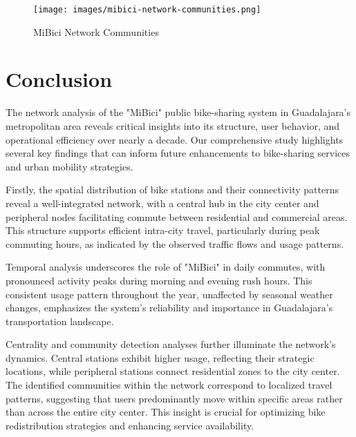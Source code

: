 \documentclass[conference]{IEEEtran}
\begin{document}
\begin{figure}
    \centering
    \texttt{[image: images/mibici-network-communities.png]}
    \caption{MiBici Network Communities}
    \label{fig:mibici-communinities}
\end{figure}


\section{Conclusion}

The network analysis of the "MiBici" public bike-sharing system in Guadalajara's metropolitan area reveals critical insights into its structure, user behavior, and operational efficiency over nearly a decade. Our comprehensive study highlights several key findings that can inform future enhancements to bike-sharing services and urban mobility strategies.

Firstly, the spatial distribution of bike stations and their connectivity patterns reveal a well-integrated network, with a central hub in the city center and peripheral nodes facilitating commute between residential and commercial areas. This structure supports efficient intra-city travel, particularly during peak commuting hours, as indicated by the observed traffic flows and usage patterns.

Temporal analysis underscores the role of "MiBici" in daily commutes, with pronounced activity peaks during morning and evening rush hours. This consistent usage pattern throughout the year, unaffected by seasonal weather changes, emphasizes the system's reliability and importance in Guadalajara's transportation landscape.

Centrality and community detection analyses further illuminate the network's dynamics. Central stations exhibit higher usage, reflecting their strategic locations, while peripheral stations connect residential zones to the city center. The identified communities within the network correspond to localized travel patterns, suggesting that users predominantly move within specific areas rather than across the entire city center. This insight is crucial for optimizing bike redistribution strategies and enhancing service availability.
\end{document}

